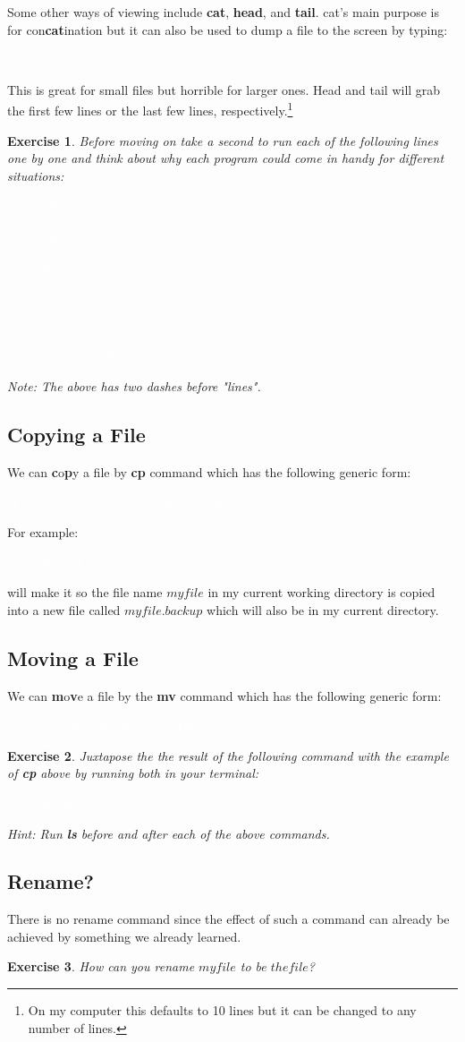 \documentclass[oneside]{book}
\newcommand{\commandline}[1]{\begin{center} \colorbox{Dark}{\textcolor{white}{#1}} \end{center}}
\newtheorem{ex}{Exercise}[chapter]
\begin{document}
Some other ways of viewing include \textbf{cat}, \textbf{head}, and \textbf{tail}. cat's main purpose is for con\textbf{cat}ination but it can also be used to dump a file to the screen by typing:
\commandline{cat myfile}
This is great for small files but horrible for larger ones. Head and tail will grab the first few lines or the last few lines, respectively.\footnote{On my computer this defaults to 10 lines but it can be changed to any number of lines.}
\begin{ex}
Before moving on take a second to run each of the following lines one by one and think about why each program could come in handy for different situations:
\commandline{less myfile}
\commandline{more myfile}
\commandline{cat myfile}
\commandline{head myfile}
\commandline{tail myfile}
\commandline{head --lines=2 myfile}
Note: The above has two dashes before "lines". 
\end{ex}

\subsection{Copying a File}
We can \textbf{c}o\textbf{p}y a file by \textbf{cp} command which has the following generic form:
\commandline{cp sourceFileName distinationFileName}
For example:
\commandline{cp myfile myfile.backup}
will make it so the file name $myfile$ in my current working directory is copied into a new file called $myfile.backup$ which will also be in my current directory.

\subsection{Moving a File}
We can \textbf{m}o\textbf{v}e a file by the \textbf{mv} command which has the following generic form:
\commandline{mv sourceFileName distinationFileName}
\begin{ex}
Juxtapose the the result of the following command with the example of \textbf{cp} above by running both in your terminal:
\commandline{mv myfile.backup myfile.backup2}
Hint: Run \textbf{ls} before and after each of the above commands.
\end{ex}

\subsection{Rename?}
There is no rename command since the effect of such a command can already be achieved by something we already learned.
\begin{ex}
	How can you rename $myfile$ to be $thefile$?
\end{ex}	
\end{document}
